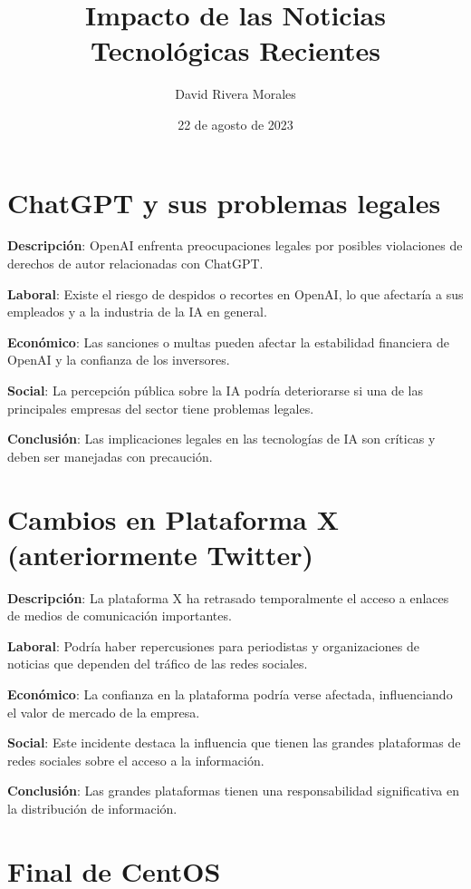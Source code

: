 \documentclass{article}
\begin{document}
\title{Impacto de las Noticias Tecnológicas Recientes}
\author{David Rivera Morales}
\date{22 de agosto de 2023}
\maketitle

\section*{ChatGPT y sus problemas legales}

\textbf{Descripción}: OpenAI enfrenta preocupaciones legales por posibles violaciones de derechos de autor relacionadas con ChatGPT.

\textbf{Laboral}: Existe el riesgo de despidos o recortes en OpenAI, lo que afectaría a sus empleados y a la industria de la IA en general.

\textbf{Económico}: Las sanciones o multas pueden afectar la estabilidad financiera de OpenAI y la confianza de los inversores.

\textbf{Social}: La percepción pública sobre la IA podría deteriorarse si una de las principales empresas del sector tiene problemas legales.

\textbf{Conclusión}: Las implicaciones legales en las tecnologías de IA son críticas y deben ser manejadas con precaución.

\section*{Cambios en Plataforma X (anteriormente Twitter)}

\textbf{Descripción}: La plataforma X ha retrasado temporalmente el acceso a enlaces de medios de comunicación importantes.

\textbf{Laboral}: Podría haber repercusiones para periodistas y organizaciones de noticias que dependen del tráfico de las redes sociales.

\textbf{Económico}: La confianza en la plataforma podría verse afectada, influenciando el valor de mercado de la empresa.

\textbf{Social}: Este incidente destaca la influencia que tienen las grandes plataformas de redes sociales sobre el acceso a la información.

\textbf{Conclusión}: Las grandes plataformas tienen una responsabilidad significativa en la distribución de información.

\section*{Final de CentOS}
\end{document}
